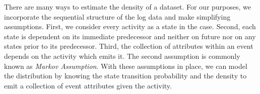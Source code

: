 \documentclass[./../../paper.tex]{subfiles}
\begin{document}


There are many ways to estimate the density of a dataset. For our purposes, we incorporate the sequential structure of the log data and make simplifying assumptions. First, we consider every activity as a state in the case. Second, each state is dependent on its immediate predecessor and neither on future nor on any states prior to its predecessor. Third, the collection of attributes within an event depends on the activity which emits it. The second assumption is commonly known as \emph{Markov Assumption}. With these assumptions in place, we can model the distribution by knowing the state transition probability and the density to emit a collection of event attributes given the activity. 


\end{document}
